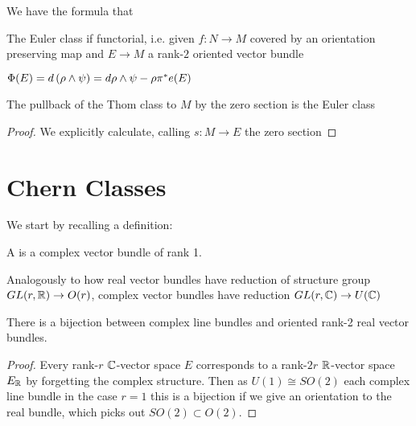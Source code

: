 \documentclass{article}
\begin{document}
\begin{prop}
	We have the formula that 
\end{prop}

\begin{corollary}
	The Euler class if functorial, i.e.  given $f:N \to M$ covered by an orientation preserving map and $E \to M$ a rank-$2$ oriented vector bundle 
\end{corollary}

\begin{prop}
	$\Phi(E) = d\left( \rho \wedge \psi \right) = d\rho \wedge \psi - \rho \pi^\ast e(E)$
\end{prop}
\begin{corollary}
	The pullback of the Thom class to $M$ by the zero section is the Euler class
\end{corollary}
\begin{proof}
We explicitly calculate, calling $s:M \to E$ the zero section 
\end{proof}

\section{Chern Classes}

We start by recalling a definition:

\begin{definition}
	A  is a complex vector bundle of rank 1.
\end{definition}

\begin{remark}
	Analogously to how real vector bundles have reduction of structure group $GL(r,\mathbb{R}) \to O(r)$, complex vector bundles have reduction $GL(r,\mathbb{C})\to U(\mathbb{C})$
\end{remark}

\begin{lemma}
	There is a bijection between complex line bundles  and oriented rank-2 real vector bundles.
\end{lemma}
\begin{proof}
	Every rank-$r$ $\mathbb{C}$-vector space $E$ corresponds to a rank-$2r$ $\mathbb{R}$-vector space $E_{\mathbb{R}}$  by forgetting the complex structure. Then as $U(1) \cong SO(2)$ each complex line bundle in the case $r=1$ this is a bijection if we give an orientation to the real bundle, which picks out $SO(2) \subset O(2)$.
\end{proof}
\end{document}
